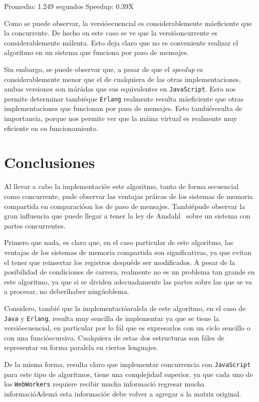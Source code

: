 \documentclass[10pt,letterpaper,oneside]{article}
\begin{document}
{\begin{center}
    Promedio: 1.249 segundos
    \medskip
    \medskip
    \medskip
    Speedup: 0.39X
    
\end{center}

Como se puede observar, la versióecuencial es considerablemente máeficiente que la concurrente. De hecho en este caso se ve que la versióoncurrente es considerablemente málenta. Esto deja claro que no es conveniente realizar el algoritmo en un sistema que funciona por paso de mensajes.

Sin embargo, se puede observar que, a pesar de que el \emph{speedup} es considerablemente menor que el de cualquiera de las otras implementaciones, ambas versiones son márádas que sus equivalentes en \verb!JavaScript!. Esto nos permite determinar tambiéque \verb!Erlang! realmente resulta máeficiente que otras implementaciones que funcionan por paso de mensajes. Esto tambiéresulta de importancia, porque nos permite ver que la máina virtual es realmente muy eficiente en su funcionamiento.


\section{Conclusiones}

Al llevar a cabo la implementacióe este algoritmo, tanto de forma secuencial como concurrente, pude observar las ventajas práicas de los sistemas de memoria compartida en comparacióon los de paso de mensajes. Tambiépude observar la gran influencia que puede llegar a tener la ley de Amdahl~\cite{amdahl} sobre un sistema con partes concurrentes.

Primero que nada, es claro que, en el caso particular de este algoritmo, las ventajas de los sistemas de memoria compartida son significativas, ya que evitan el tener que reinsertar los registros despuéde ser modificados. A pesar de la posibilidad de condiciones de carrera, realmente no es un problema tan grande en este algoritmo, ya que si se dividen adecuadamente las partes sobre las que se va a procesar, no deberíhaber ningúoblema.

Considero, tambié que la implementacióaralela de este algoritmo, en el caso de \verb!Java! y \verb!Erlang!, resulta muy sencilla de implementar ya que se tiene la versióecuencial, en particular por lo fál que es expresarlos con un ciclo sencillo o con una funcióecursiva. Cualquiera de estas dos estructuras son fáles de representar en forma paralela en ciertos lenguajes.

De la misma forma, resulta claro que implementar concurrencia con \verb!JavaScript! para este tipo de algoritmos, tiene una complejidad superior, ya que cada uno de los \verb!WebWorkers! requiere recibir mucha informació regresar mucha informacióAdemá esta informacióe debe volver a agregar a la matriz original.

}
\end{document}

